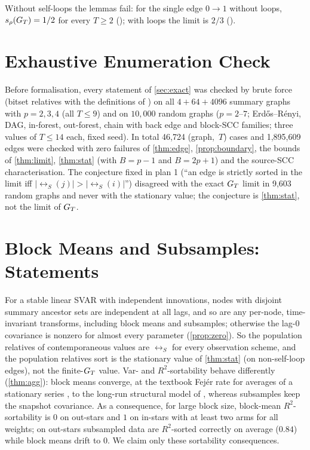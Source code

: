 \begin{remark}
Without self-loops the lemmas fail: for the single edge $0\to1$ without loops,
$s_\rho(G_T)=1/2$ for every $T\ge2$ (); with loops the
limit is $2/3$ ().
\end{remark}

\section{Exhaustive Enumeration Check}
\label{app:enum}

Before formalisation, every statement of \cref{sec:exact} was checked by
brute force (bitset relatives with the definitions of
\citealp{reisach2026topological}) on all $4+64+4096$ summary graphs with
$p=2,3,4$ (all $T\le9$) and on $10{,}000$ random graphs ($p=2$--$7$; Erd\H{o}s--R\'enyi,
DAG, in-forest, out-forest, chain with back edge and block-SCC families;
three values of $T\le14$ each, fixed seed). In total 46{,}724 (graph,~$T$)
cases and 1{,}895{,}609 edges were checked with zero failures of
\cref{thm:edge}, \cref{prop:boundary}, the bounds of \cref{thm:limit},
\cref{thm:stat} (with $B=p-1$ and $B=2p+1$) and the source-SCC
characterisation. The conjecture fixed in plan 1 (``an edge is strictly
sorted in the limit iff $|\rel_S(j)|>|\rel_S(i)|$'') disagreed with the exact
$G_T$ limit in 9{,}603 random graphs and never with the stationary value; the
conjecture is \cref{thm:stat}, not the limit of $G_T$.

\section{Block Means and Subsamples: Statements}
\label{app:aggstate}




For a stable linear SVAR with independent innovations, nodes with disjoint
summary ancestor sets are independent at all lags, and so are any per-node,
time-invariant transforms, including block means and subsamples; otherwise
the lag-0 covariance is nonzero for almost every parameter
(\cref{prop:zero}). So the population relatives of
contemporaneous values are $\rel_S$ for every observation scheme, and the
population relatives sort is the stationary value of \cref{thm:stat} (on
non-self-loop edges), not the finite-$G_T$ value. Var- and $R^2$-sortability
behave differently (\cref{thm:agg}): block means converge, at the textbook
Fej\'er rate for averages of a stationary series
\citep[Ch.~7]{brockwell1991time}, to the long-run structural model of
\citet{gong2017aggregated}, whereas subsamples keep the snapshot covariance. As a
consequence, for large block size, block-mean $R^2$-sortability is $0$ on
out-stars and $1$ on in-stars with at least two arms for all weights; on
out-stars subsampled data are $R^2$-sorted correctly on average ($0.84$) while
block means drift to $0$. We claim only these sortability consequences.


